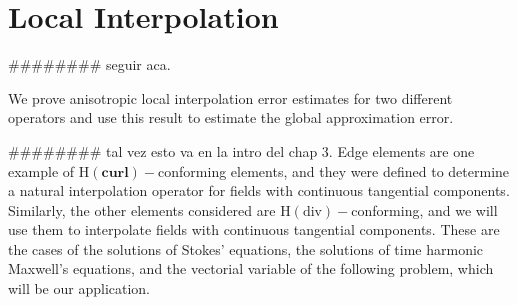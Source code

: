 \chapter{Local Interpolation}

{\color{Orange}\#\#\#\#\#\#\#\# seguir aca.}

We prove anisotropic local interpolation error estimates for two different operators
and use this result to estimate the global approximation error.

{\color{Orange}\#\#\#\#\#\#\#\# tal vez esto va en la intro del chap 3.
Edge elements are one example of $\textrm{H}(\textbf{curl})-$conforming elements, and they were
defined to determine a natural interpolation operator for fields with continuous tangential components.
Similarly, the other elements considered are $\textrm{H}(\text{div})-$conforming, and we will use them 
to interpolate fields with continuous tangential components. These are the cases of the
solutions of Stokes' equations, the solutions of time harmonic Maxwell's equations, and the vectorial
variable of the following problem, which will be our application.
}	




